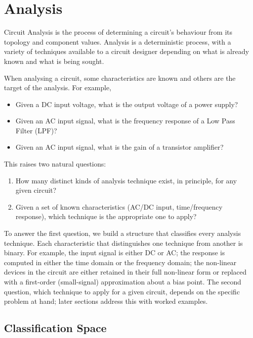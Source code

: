 \section{Analysis}

Circuit Analysis is the process of determining a circuit's behaviour from its
topology and component values. Analysis is a deterministic process, with a
variety of techniques available to a circuit designer depending on what is
already known and what is being sought.

When analysing a circuit, some characteristics are known and others are the
target of the analysis. For example,
\begin{itemize}
    \item Given a DC input voltage, what is the output voltage of a
      power supply?
    \item Given an AC input signal, what is the frequency response of a
      Low Pass Filter (LPF)?
    \item Given an AC input signal, what is the gain of a transistor
      amplifier?
\end{itemize}
This raises two natural questions:
\begin{enumerate}
    \item How many distinct kinds of analysis technique exist, in
      principle, for any given circuit?
    \item Given a set of known characteristics (AC/DC input, time/frequency
      response), which technique is the appropriate one to apply?
\end{enumerate}
To answer the first question, we build a structure that classifies every
analysis technique. Each characteristic that distinguishes one technique from
another is binary. For example, the input signal is either DC or AC; the
response is computed in either the time domain or the frequency domain; the
non-linear devices in the circuit are either retained in their full
non-linear form or replaced with a first-order (small-signal) approximation
about a bias point. The second question, which technique to apply for a
given circuit, depends on the specific problem at hand; later sections
address this with worked examples.

\subsection{Classification Space}

